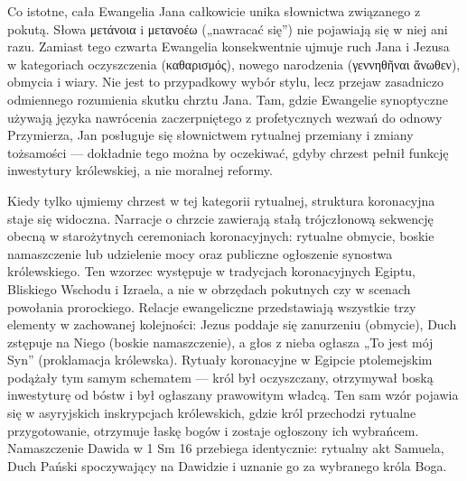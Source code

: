 Co istotne, cała Ewangelia Jana całkowicie unika słownictwa związanego z pokutą.
Słowa μετάνοια i μετανοέω („nawracać się”) nie pojawiają się w niej ani razu.
Zamiast tego czwarta Ewangelia konsekwentnie ujmuje ruch Jana i Jezusa w kategoriach oczyszczenia (καθαρισμός), nowego narodzenia (γεννηθῆναι ἄνωθεν), obmycia i wiary.
Nie jest to przypadkowy wybór stylu, lecz przejaw zasadniczo odmiennego rozumienia skutku chrztu Jana.
Tam, gdzie Ewangelie synoptyczne używają języka nawrócenia zaczerpniętego z profetycznych wezwań do odnowy Przymierza, Jan posługuje się słownictwem rytualnej przemiany i zmiany tożsamości — dokładnie tego można by oczekiwać, gdyby chrzest pełnił funkcję inwestytury królewskiej, a nie moralnej reformy.

Kiedy tylko ujmiemy chrzest w tej kategorii rytualnej, struktura koronacyjna staje się widoczna.
Narracje o chrzcie zawierają stałą trójczłonową sekwencję obecną w starożytnych ceremoniach koronacyjnych: rytualne obmycie, boskie namaszczenie lub udzielenie mocy oraz publiczne ogłoszenie synostwa królewskiego.
Ten wzorzec występuje w tradycjach koronacyjnych Egiptu, Bliskiego Wschodu i Izraela, a nie w obrzędach pokutnych czy w scenach powołania prorockiego.
Relacje ewangeliczne przedstawiają wszystkie trzy elementy w zachowanej kolejności: Jezus poddaje się zanurzeniu (obmycie), Duch zstępuje na Niego (boskie namaszczenie), a głos z nieba ogłasza „To jest mój Syn” (proklamacja królewska).
Rytuały koronacyjne w Egipcie ptolemejskim podążały tym samym schematem — król był oczyszczany, otrzymywał boską inwestyturę od bóstw i był ogłaszany prawowitym władcą.
Ten sam wzór pojawia się w asyryjskich inskrypcjach królewskich, gdzie król przechodzi rytualne przygotowanie, otrzymuje łaskę bogów i zostaje ogłoszony ich wybrańcem.
Namaszczenie Dawida w 1 Sm 16 przebiega identycznie: rytualny akt Samuela, Duch Pański spoczywający na Dawidzie i uznanie go za wybranego króla Boga.

